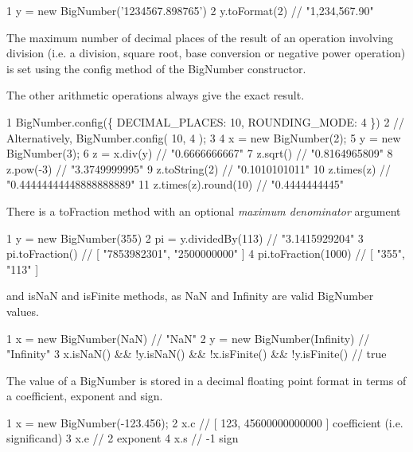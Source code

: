 \begin{DoxyCode}
1 y = new BigNumber('1234567.898765')
2 y.toFormat(2)                       // "1,234,567.90"
\end{DoxyCode}


The maximum number of decimal places of the result of an operation involving division (i.\+e. a division, square root, base conversion or negative power operation) is set using the {\ttfamily config} method of the {\ttfamily Big\+Number} constructor.

The other arithmetic operations always give the exact result.


\begin{DoxyCode}
1 BigNumber.config(\{ DECIMAL\_PLACES: 10, ROUNDING\_MODE: 4 \})
2 // Alternatively, BigNumber.config( 10, 4 );
3 
4 x = new BigNumber(2);
5 y = new BigNumber(3);
6 z = x.div(y)                        // "0.6666666667"
7 z.sqrt()                            // "0.8164965809"
8 z.pow(-3)                           // "3.3749999995"
9 z.toString(2)                       // "0.1010101011"
10 z.times(z)                          // "0.44444444448888888889"
11 z.times(z).round(10)                // "0.4444444445"
\end{DoxyCode}


There is a {\ttfamily to\+Fraction} method with an optional {\itshape maximum denominator} argument


\begin{DoxyCode}
1 y = new BigNumber(355)
2 pi = y.dividedBy(113)               // "3.1415929204"
3 pi.toFraction()                     // [ "7853982301", "2500000000" ]
4 pi.toFraction(1000)                 // [ "355", "113" ]
\end{DoxyCode}


and {\ttfamily is\+Na\+N} and {\ttfamily is\+Finite} methods, as {\ttfamily Na\+N} and {\ttfamily Infinity} are valid {\ttfamily Big\+Number} values.


\begin{DoxyCode}
1 x = new BigNumber(NaN)                                           // "NaN"
2 y = new BigNumber(Infinity)                                      // "Infinity"
3 x.isNaN() && !y.isNaN() && !x.isFinite() && !y.isFinite()        // true
\end{DoxyCode}


The value of a Big\+Number is stored in a decimal floating point format in terms of a coefficient, exponent and sign.


\begin{DoxyCode}
1 x = new BigNumber(-123.456);
2 x.c                                 // [ 123, 45600000000000 ]  coefficient (i.e. significand)
3 x.e                                 // 2                        exponent
4 x.s                                 // -1                       sign
\end{DoxyCode}


